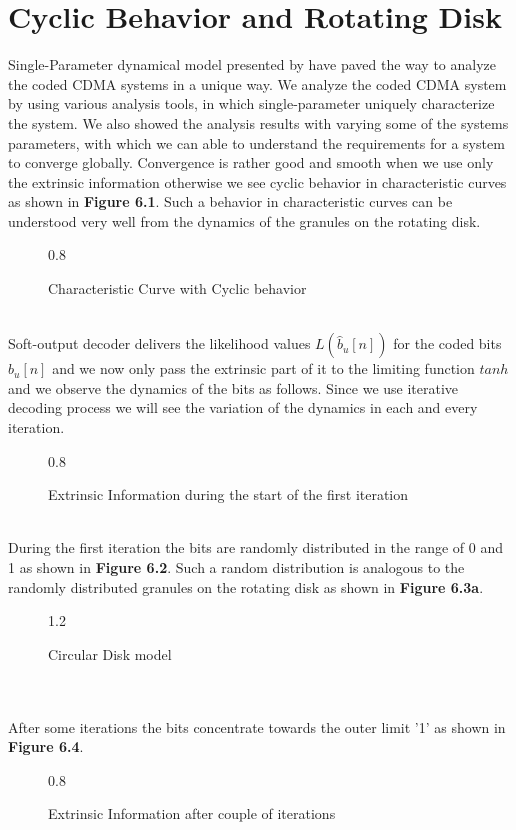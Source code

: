 \chapter{Cyclic Behavior and Rotating Disk}
Single-Parameter dynamical model presented by \cite{JC} have paved the way to analyze the coded CDMA systems in a unique way. We analyze the coded CDMA system by using various analysis tools, in which single-parameter uniquely characterize the system. We also showed the analysis results with varying some of the systems parameters, with which we can able to understand the requirements for a system to converge globally. Convergence is rather good and smooth when we use only the extrinsic information otherwise we see cyclic behavior in characteristic curves as shown in \textbf{Figure 6.1}. Such a behavior in characteristic curves can be understood very well from the dynamics of the granules on the rotating disk.
\begin{figure}[htb]
\centerline{  {0.8} }
\caption{Characteristic Curve with Cyclic behavior}
\end{figure}\\
Soft-output decoder delivers the likelihood values $L(\hat{b}_u[n])$ for the coded bits $b_u[n]$ and we now only pass the extrinsic part of it to the limiting function $tanh$ and we observe the dynamics of the bits as follows. Since we use iterative decoding process we will see the variation of the dynamics in each and every iteration.
\begin{figure}[htb]
\centerline{  {0.8} }
\caption{Extrinsic Information during the start of the first iteration}
\end{figure}\\
During the first iteration the bits are randomly distributed in the range of 0 and 1 as shown in \textbf{Figure 6.2}. Such a random distribution is analogous to the randomly distributed granules on the rotating disk as shown in \textbf{Figure 6.3a}.
\begin{figure}[htb]
\centerline{  {1.2} }
\caption{Circular Disk model}
\end{figure}\\ \\
\newpage
After some iterations the bits concentrate towards the outer limit '1' as shown in \textbf{Figure 6.4}.
\begin{figure}[htb]
\centerline{  {0.8} }
\caption{Extrinsic Information after couple of iterations}
\end{figure}\\
